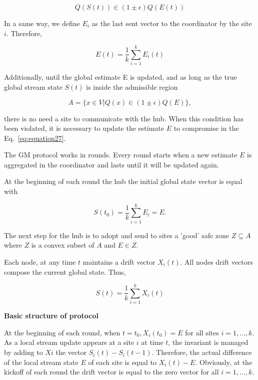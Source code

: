 \begin{equation}
    Q(S(t)) \in (1 \pm \epsilon) Q(E(t))\label{eq:equation27}
\end{equation}

In a same way, we define $E_i$ as the last sent vector to the coordinator by the site $i$.
Therefore,

\begin{equation}
    E(t) = \frac{1}{k} \sum_{i=1}^{k} E_i(t)\label{eq:equation28}
\end{equation}

Additionally, until the global estimate E is updated, and as long as the true global stream state $S(t)$ is inside the admissible region

\begin{equation}
    A = \{ x \in V | Q(x) \in (1 \pm \epsilon)Q(E) \} ,\label{eq:equation29}
\end{equation}

there is no need a site to communicate with the hub.
When this condition has been violated, it is necessary to update the estimate $E$ to compromise in the Eq.~\ref{eq:equation27}.

The GM protocol works in rounds.
Every round starts when a new estimate $E$ is aggregated in the coordinator and lasts until it will be updated again.

At the beginning of each round the hub the initial global state vector is equal with

\begin{equation}
    S(t_0) = \frac{1}{k} \sum_{i=1}^{k} E_i = E.\label{eq:equation30}
\end{equation}

The next step for the hub is to adopt and send to sites a 'good' safe zone $Z \subseteq A$ where $Z$ is a convex subset of $A$ and $E \in Z$.

Each node, at any time $t$  maintains a drift vector $X_i(t)$.
All nodes drift vectors compose the current global state.
Thus,

\begin{equation}
    S(t) = \frac{1}{k} \sum_{i=1}^{k} X_i(t)\label{eq:equation31}
\end{equation}

{\large \textbf{Basic structure of protocol}}

At the beginning of each round, when $t = t_0, X_i(t_0) = E$ for all sites $i = 1, \dots, k$.
As a local stream update appears at a site $i$ at time $t$, the invariant is managed by adding to $Xi$ the vector $S_i(t) - S_i(t-1)$.
Therefore, the actual difference of the local stream state $E$ of each site is equal to $X_i(t) - E$.
Obviously, at the kickoff of each round the drift vector is equal to the zero vector for all $i = 1, \dots, k$.

